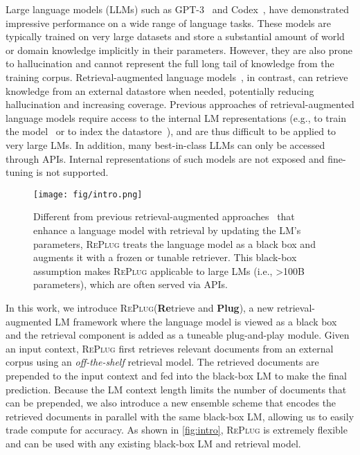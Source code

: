 \documentclass[nohyperref]{article}
\newcommand{\model}{\textsc{RePlug}\xspace}
\theoremstyle{plain}
\theoremstyle{definition}
\theoremstyle{remark}
\begin{document}
Large language models (LLMs) such as GPT-3~\cite{NEURIPS2020_1457c0d6} and Codex~\cite{DBLP:journals/corr/abs-2107-03374}, 
have demonstrated impressive performance on a wide range of language tasks.
These models are typically trained on very large datasets and store a substantial amount of world or domain knowledge implicitly in their parameters. However, they are also prone to hallucination and cannot represent the full long tail of knowledge from the training corpus. Retrieval-augmented language models~\cite{Khandelwal2020Generalization, borgeaud2022improving, 
izacard2022few, yasunaga2022retrieval}, in contrast, can retrieve knowledge from an external datastore when needed, potentially reducing hallucination and increasing coverage. 
Previous approaches of retrieval-augmented language models require access to the internal LM representations (e.g., to train the model~\cite{borgeaud2022improving, izacard2022few} or to index the datastore~\cite{Khandelwal2020Generalization}), and are thus difficult to be applied to very large LMs. 
In addition, many best-in-class LLMs can only be accessed through APIs. Internal representations of such models are not exposed and fine-tuning is not supported.




\begin{figure}[]
\centering 
\texttt{[image: fig/intro.png]}
\caption{
{Different from previous retrieval-augmented approaches~\cite{borgeaud2022improving} that enhance a language model with retrieval by updating the LM's parameters, \model treats the language model as a black box and augments it with a frozen or tunable retriever.} 
This black-box assumption makes \model applicable to large LMs (i.e., >100B parameters), which are often served via APIs.
} \label{fig:intro}
\end{figure}

In this work, we introduce \model (\textbf{Re}trieve and \textbf{Plug}), a new retrieval-augmented LM framework where the language model is viewed as a black box and the retrieval component is added as a tuneable plug-and-play module.
Given an input context, \model first retrieves relevant documents from an external corpus using an \textit{off-the-shelf} retrieval model. The retrieved documents are prepended to the input context and fed into the black-box LM to make the final prediction. Because the LM context length limits the number of documents that can be prepended, we also introduce a new ensemble scheme that encodes the retrieved documents in parallel with the same black-box LM, allowing us to easily trade compute for accuracy. 
As shown in \autoref{fig:intro}, \model is extremely flexible and can be used with any existing black-box LM and retrieval model. 
 
\end{document}
